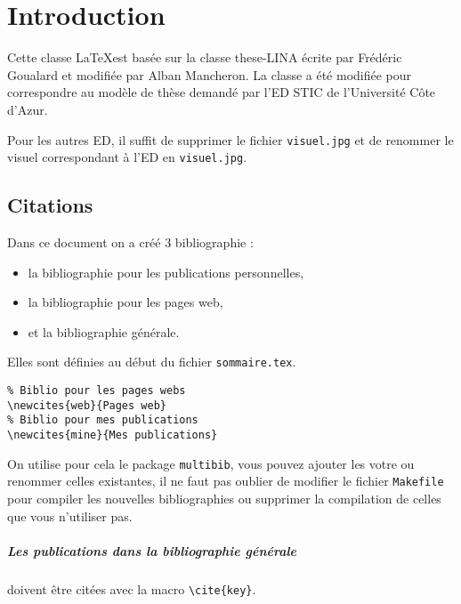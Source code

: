 
\chapter{Introduction}

Cette classe \LaTeX est basée sur la classe these-LINA écrite par Frédéric Goualard et modifiée par Alban Mancheron. La classe a été modifiée pour correspondre au modèle de thèse demandé par l'ED STIC de l'Université Côte d'Azur.

Pour les autres ED, il suffit de supprimer le fichier \texttt{visuel.jpg} et de renommer le visuel correspondant à l'ED en \texttt{visuel.jpg}.

\section{Citations}

Dans ce document on a créé 3 bibliographie :
\begin{itemize}
  \item la bibliographie pour les publications personnelles,
  \item la bibliographie pour les pages web,
  \item et la bibliographie générale.
\end{itemize}

Elles sont définies au début du fichier \texttt{sommaire.tex}.

\begin{framed}
\begin{verbatim}
% Biblio pour les pages webs
\newcites{web}{Pages web}
% Biblio pour mes publications
\newcites{mine}{Mes publications}
\end{verbatim}\vspace{-0.5em}
\end{framed}

On utilise pour cela le package \texttt{multibib}, vous pouvez ajouter les votre ou renommer celles existantes, il ne faut pas oublier de modifier le fichier \texttt{Makefile} pour compiler les nouvelles bibliographies ou supprimer la compilation de celles que vous n'utiliser pas.

\paragraph{Les publications dans la bibliographie générale} doivent être citées avec la macro \texttt{\textbackslash cite\{key\}}.

